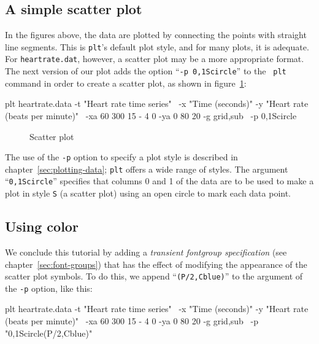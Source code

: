 \documentclass{book}
\begin{document}
\subsection{A simple scatter plot}

In the figures above, the data are plotted by connecting the points
with straight line segments.  This is {\tt plt}'s default plot style,
and for many plots, it is adequate.  For {\tt heartrate.dat},
however, a scatter plot may be a more appropriate format.  The next
version of our plot adds the option ``{\tt -p 0,1Scircle}'' to the {\tt
plt} command in order to create a scatter plot, as shown in
figure~\ref{fig:simple4}:

\begin{center}
\begin{boxedverbatim}
plt heartrate.data -t "Heart rate time series" \
  -x "Time (seconds)" -y "Heart rate (beats per minute)" \
  -xa 60 300 15 - 4 0 -ya 0 80 20 -g grid,sub \
  -p 0,1Scircle
\end{boxedverbatim}
\end{center}

\begin{figure}
\begin{center}
\caption{Scatter plot \label{fig:simple4}}
\end{center}
\end{figure}

The use of the {\tt -p} option to specify a plot style is described in
chapter~\ref{sec:plotting-data};  {\tt plt} offers a wide range of
styles.  The argument ``{\tt 0,1Scircle}'' specifies that columns 0 and 1
of the data are to be used to make a plot in style {\tt S} (a
scatter plot) using an open circle to mark each data point.

\subsection{Using color}

We conclude this tutorial by adding a {\em transient
fontgroup specification} (see chapter~\ref{sec:font-groups}) that has
the effect of modifying the appearance of the scatter plot symbols.
To do this, we append ``{\tt (P/2,Cblue)}'' to the argument of the
{\tt -p} option, like this:

\begin{center}
\begin{boxedverbatim}
plt heartrate.data -t "Heart rate time series" \
  -x "Time (seconds)" -y "Heart rate (beats per minute)" \
  -xa 60 300 15 - 4 0 -ya 0 80 20 -g grid,sub \
  -p "0,1Scircle(P/2,Cblue)"
\end{boxedverbatim}
\end{center}
\end{document}
